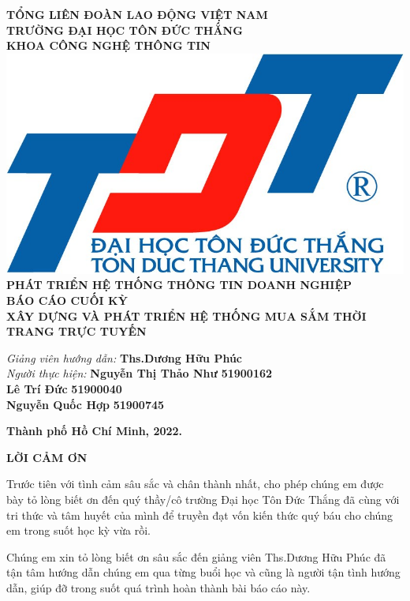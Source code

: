 \documentclass[12pt,a4paper,2sides]{report}
\newcommand{\khoa}{CÔNG NGHỆ THÔNG TIN} %
\newcommand{\bai}{BÁO CÁO CUỐI KỲ}
\newcommand{\de}{XÂY DỰNG VÀ PHÁT TRIỂN HỆ THỐNG MUA SẮM THỜI TRANG TRỰC TUYẾN}
\newcommand{\monhoc}{PHÁT TRIỂN HỆ THỐNG THÔNG TIN DOANH NGHIỆP} %
\newcommand{\gvhd}{Ths.Dương Hữu Phúc} %
\newcommand{\tacgia}{Nguyễn Thị Thảo Như} %
\newcommand{\mstacgia}{51900162} %
\newcommand{\svhai}{Lê Trí Đức}
\newcommand{\msvhai}{51900040}
\newcommand{\svba}{Nguyễn Quốc Hợp}
\newcommand{\msvba}{51900745}
\newcommand{\nam}{2022}
\begin{document}
	
% 
\begin{center}
	\large{\textbf{TỔNG LIÊN ĐOÀN LAO ĐỘNG VIỆT NAM}} \\
	\large{\textbf{TRƯỜNG ĐẠI HỌC TÔN ĐỨC THẮNG}} \\
	\large{\textbf{\MakeUppercase{KHOA \khoa}}} \\\vspace*{1cm}	
	\includegraphics[width=0.5\linewidth]{lib/TDTlogo.jpg}\\\vspace*{1cm}	
	\Large{\textbf{\MakeUppercase{\monhoc}}}\vspace*{0.5cm}\\
	\Large{\textbf{\MakeUppercase{\bai}}}\\		
	\LARGE{\textbf{\MakeUppercase{\de}}}\vspace*{2cm}\\

\begin{flushright}			
	\large{\textit{Giảng viên hướng dẫn:}}
	\large{\textbf{\gvhd}} \\
	\large{\textit{Người thực hiện:}} 
	\large{\textbf{\tacgia}}
	\large{\textbf{\mstacgia}}\\
	\large{\textbf{\svhai}}
	\large{\textbf{\msvhai}}\\
	\large{\textbf{\svba}}
	\large{\textbf{\msvba}}\\

	\vspace*{1.5cm}
\end{flushright}
	\large{\textbf{Thành phố Hồ Chí Minh, \nam.}}
\end{center}	
	\newpage
\begin{center}
	\Large{\textbf{LỜI CẢM ƠN}}
\end{center}

Trước tiên với tình cảm sâu sắc và chân thành nhất, cho phép chúng em được bày tỏ lòng biết ơn đến quý thầy/cô trường Đại học Tôn Đức Thắng đã cùng với tri thức và tâm huyết của mình để truyền đạt vốn kiến thức quý báu cho chúng em trong suốt học kỳ vừa rồi.

Chúng em xin tỏ lòng biết ơn sâu sắc đến giảng viên \gvhd \mbox{} đã tận tâm hướng dẫn chúng em qua từng buổi học và cũng là người tận tình hướng dẫn, giúp đỡ trong suốt quá trình hoàn thành bài báo cáo này.
\end{document}
